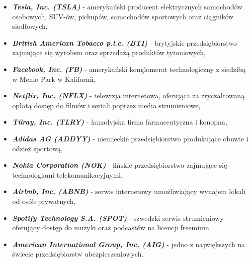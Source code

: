 \documentclass[magister]{dyplom}
\begin{document}
\begin{itemize}
	\item \textit{\textbf{Tesla, Inc. (TSLA)}} - amerykański producent elektrycznych samochodów osobowych, SUV-ów, pickupów, samochodów sportowych oraz ciągników siodłowych\cite{tesla},
	\item \textit{\textbf{British American Tobacco p.l.c. (BTI)}} - brytyjskie przedsiębiorstwo zajmujące się wyrobem oraz sprzedażą produktów tytoniowych,
	\item \textit{\textbf{Facebook, Inc. (FB)}} - amerykański konglomerat technologiczny z siedzibą w Menlo Park w Kalifornii\cite{facebook},
	\item \textit{\textbf{Netflix, Inc. (NFLX)}} - telewizja internetowa, oferująca za zryczałtowaną opłatą dostęp do filmów i seriali poprzez media strumieniowe\cite{netflix},
	\item \textit{\textbf{Tilray, Inc. (TLRY)}} - kanadyjska firma farmaceutyczna i konopna\cite{tilray},
	\item \textit{\textbf{Adidas AG (ADDYY)}} - niemieckie przedsiębiorstwo produkujące obuwie i odzież sportową\cite{adidas},
	\item \textit{\textbf{Nokia Corporation (NOK)}} - fińskie przedsiębiorstwo zajmujące się technologiami telekomunikacyjnymi\cite{nokia},
	\item \textit{\textbf{Airbnb, Inc. (ABNB)}} - serwis internetowy umożliwiający wynajem lokali od osób prywatnych\cite{airbnb},
	\item \textit{\textbf{Spotify Technology S.A. (SPOT)}} - szwedzki serwis strumieniowy oferujący dostęp do muzyki oraz podcastów na licencji freemium\cite{spotify}.
	\item \textit{\textbf{American International Group, Inc. (AIG)}} - jedno z największych na świecie przedsiębiorstw ubezpieczeniowych\cite{aig}.
\end{itemize}
\end{document}
